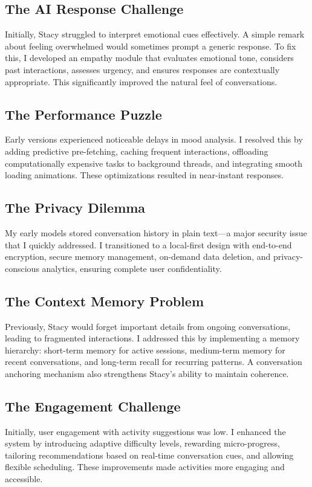 \documentclass[12pt]{article}
\begin{document}
\subsection{The AI Response Challenge}
Initially, Stacy struggled to interpret emotional cues effectively. A simple remark about feeling overwhelmed would sometimes prompt a generic response. To fix this, I developed an empathy module that evaluates emotional tone, considers past interactions, assesses urgency, and ensures responses are contextually appropriate. This significantly improved the natural feel of conversations.

\subsection{The Performance Puzzle}
Early versions experienced noticeable delays in mood analysis. I resolved this by adding predictive pre-fetching, caching frequent interactions, offloading computationally expensive tasks to background threads, and integrating smooth loading animations. These optimizations resulted in near-instant responses.

\subsection{The Privacy Dilemma}
My early models stored conversation history in plain text—a major security issue that I quickly addressed. I transitioned to a local-first design with end-to-end encryption, secure memory management, on-demand data deletion, and privacy-conscious analytics, ensuring complete user confidentiality.

\subsection{The Context Memory Problem}
Previously, Stacy would forget important details from ongoing conversations, leading to fragmented interactions. I addressed this by implementing a memory hierarchy: short-term memory for active sessions, medium-term memory for recent conversations, and long-term recall for recurring patterns. A conversation anchoring mechanism also strengthens Stacy's ability to maintain coherence.

\subsection{The Engagement Challenge}
Initially, user engagement with activity suggestions was low. I enhanced the system by introducing adaptive difficulty levels, rewarding micro-progress, tailoring recommendations based on real-time conversation cues, and allowing flexible scheduling. These improvements made activities more engaging and accessible.
\end{document}
